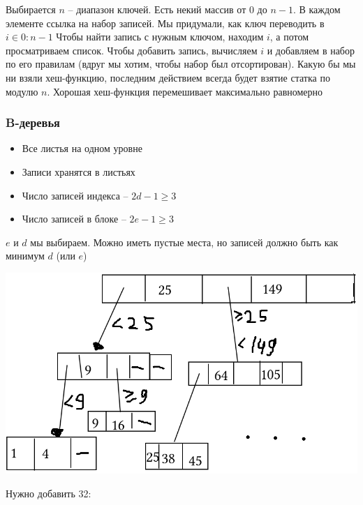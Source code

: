 Выбирается $n$ -- диапазон ключей. Есть некий массив от 0 до $n-1$. В каждом элементе ссылка на набор записей. Мы придумали, как ключ переводить в $i \in 0:n-1$ Чтобы найти запись с нужным ключом, находим $i$, а потом просматриваем список. Чтобы добавить запись, вычисляем $i$ и добавляем в набор по его правилам (вдруг мы хотим, чтобы набор был отсортирован). Какую бы мы ни взяли хеш-функцию, последним действием всегда будет взятие статка по модулю $n$. Хорошая хеш-функция перемешивает максимально равномерно

\subsubsection{B-деревья}

\begin{definition}
    \hfill
    \begin{itemize}
    	\item Все листья на одном уровне
        \item Записи хранятся в листьях
        \item Число записей индекса -- $2d - 1 \ge 3$
        \item Число записей в блоке -- $2e - 1 \ge 3$
    \end{itemize}
    $e$ и $d$ мы выбираем. Можно иметь пустые места, но записей должно быть как минимум $d$ (или $e$)
\end{definition}


\includegraphics[scale=0.6]{1}

Нужно добавить 32:

